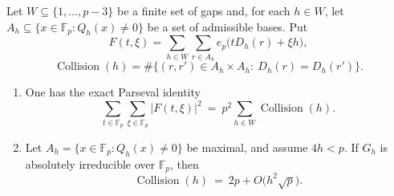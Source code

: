 \begin{proposition}\label{thm:sh-l2freq}
Let $W\subseteq\{1,\ldots,p-3\}$ be a finite set of gaps and, for each
$h\in W$, let $A_h\subseteq\{x\in\mathbb F_p:Q_h(x)\ne0\}$ be a set of
admissible bases.  Put
\[
 F(t,\xi)=\sum_{h\in W}\sum_{r\in A_h}e_p\bigl(tD_h(r)+\xi h\bigr),
\]
\[
 \operatorname{Collision}(h)=\#\{(r,r')\in A_h\times A_h:\
 D_h(r)=D_h(r')\}.
\]
\begin{enumerate}
\item[(a)] One has the exact Parseval identity
\[
 \sum_{t\in\mathbb F_p}\sum_{\xi\in\mathbb F_p}|F(t,\xi)|^2
 \ =\ p^2\sum_{h\in W}\operatorname{Collision}(h).
\]
\item[(b)] Let $A_h=\{x\in\mathbb F_p:Q_h(x)\ne0\}$ be maximal, and
assume $4h<p$.  If $G_h$ is absolutely irreducible over
$\mathbb F_p$, then
\[
 \operatorname{Collision}(h)\ =\ 2p+O\!\bigl(h^2\sqrt p\bigr).
\]
\end{enumerate}
\end{proposition}

